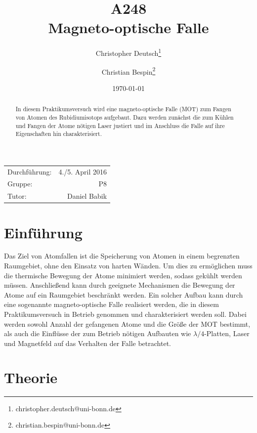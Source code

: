 \documentclass[11pt, a4paper]{article}
\title{A248 \\ Magneto-optische Falle}
\author{Christopher Deutsch\footnote{christopher.deutsch@uni-bonn.de} \and Christian Bespin\footnote{christian.bespin@uni-bonn.de}}
\date{\today}
\numberwithin{equation}{section}
\begin{document}
\begin{titlepage}

\maketitle

\begin{center}
\begin{tabular}{l r}
Durchführung: & 4./5. April 2016 \\
Gruppe: & P8 \\
Tutor: & Daniel Babik
\end{tabular}
\end{center}

\begin{abstract}
\noindent In diesem Praktikumsversuch wird eine magneto-optische Falle (MOT) zum Fangen von Atomen des Rubidiumisotops  aufgebaut. Dazu werden zunächst die zum Kühlen und Fangen der Atome nötigen Laser justiert und im Anschluss die Falle auf ihre Eigenschaften hin charakterisiert.
\end{abstract}

\end{titlepage}

\tableofcontents
\newpage

\section{Einführung}

Das Ziel von Atomfallen ist die Speicherung von Atomen in einem begrenzten Raumgebiet, ohne den Einsatz von harten Wänden.
Um dies zu ermöglichen muss die thermische Bewegung der Atome minimiert werden, sodass gekühlt werden müssen.
Anschließend kann durch geeignete Mechanismen die Bewegung der Atome auf ein Raumgebiet beschränkt werden.
Ein solcher Aufbau kann durch eine sogenannte magneto-optische Falle realisiert werden, die in diesem Praktikumsversuch in Betrieb genommen und charakterisiert werden soll.
Dabei werden sowohl Anzahl der gefangenen Atome und die Größe der MOT bestimmt, als auch die Einflüsse der zum Betrieb nötigen Aufbauten wie $\lambda/4$-Platten, Laser und Magnetfeld auf das Verhalten der Falle betrachtet.

\section{Theorie}
\end{document}
